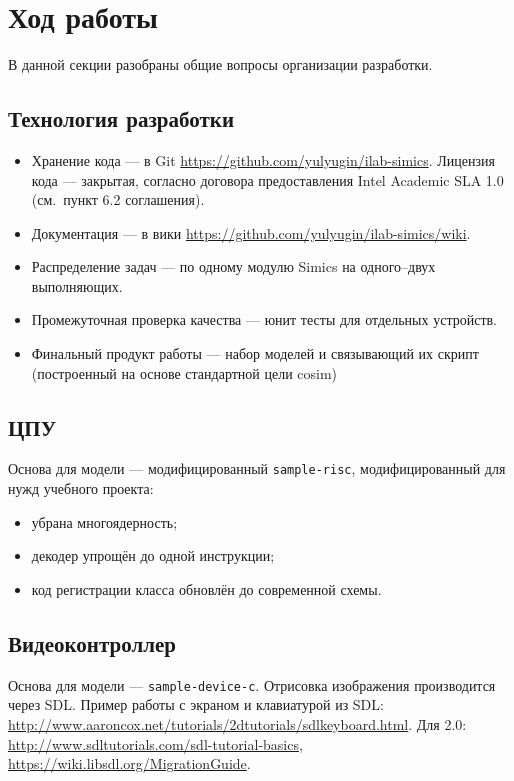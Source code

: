 \section{Ход работы}

В данной секции разобраны общие вопросы организации разработки.
\subsection{Технология разработки}

\begin{itemize}
\item Хранение кода --- в Git \url{https://github.com/yulyugin/ilab-simics}. Лицензия кода --- закрытая, согласно договора предоставления Intel Academic SLA 1.0 (см.~пункт 6.2 соглашения).

\item Документация --- в вики \url{https://github.com/yulyugin/ilab-simics/wiki}.

\item Распределение задач --- по одному модулю Simics на одного--двух выполняющих.
\item Промежуточная проверка качества --- юнит тесты для отдельных устройств.
\item Финальный продукт работы --- набор моделей и связывающий их скрипт (построенный на основе стандартной цели cosim)
\end{itemize}

\subsection{ЦПУ}

Основа для модели --- модифицированный \texttt{sample-risc}, модифицированный для нужд учебного проекта:
\begin{itemize}
    \item убрана многоядерность;
    \item декодер упрощён до одной инструкции;
	\item код регистрации класса обновлён до современной схемы.
\end{itemize}


\subsection{Видеоконтроллер}

Основа для модели --- \texttt{sample-device-c}. Отрисовка изображения производится через SDL. Пример работы с экраном и клавиатурой из SDL: \url{http://www.aaroncox.net/tutorials/2dtutorials/sdlkeyboard.html}. Для 2.0: \url{http://www.sdltutorials.com/sdl-tutorial-basics}, \url{https://wiki.libsdl.org/MigrationGuide}.

